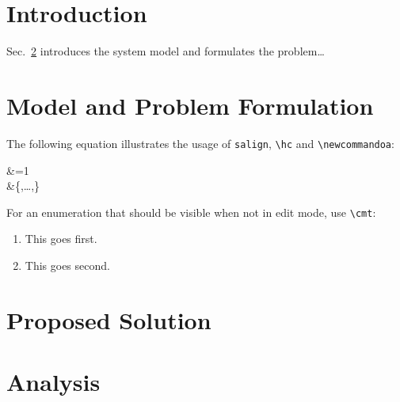 \documentclass{article}
\begin{document}
\section{Introduction}
\begin{bullets}
    \blt[overview]
    \blt[motivation]
    \blt[contributions]
    Sec.~\ref{sec:model} introduces the system model and formulates the problem\ldots
    \blt[notation]
\end{bullets}

\section{Model and Problem Formulation}
\label{sec:model}

\begin{bullets}
    \blt[model]    The following equation illustrates the usage of \texttt{salign}, \texttt{\textbackslash hc} and \texttt{\textbackslash{}newcommandoa}:
    \begin{salign}[eq:globallabel]
        \label{eq:testequation}
        \testsymbol&=1\\
        \sectestsymbol &\in \{\sectestsymbol[0],\ldots,\sectestsymbol[N-1]\}
    \end{salign}

    For an enumeration that should be visible when not in edit mode, use \texttt{\textbackslash cmt}:
    \begin{enumerate}
        \item {} This goes first.
        \item {} This goes second.
    \end{enumerate}


\end{bullets}

\section{Proposed Solution}


\section{Analysis}
\end{document}
